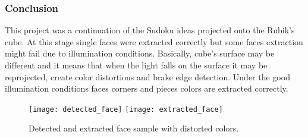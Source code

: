 \documentclass[../../main]{subfiles}
\begin{document}
\subsubsection{Conclusion}

This project was a continuation of the Sudoku ideas projected onto the Rubik's cube. At this stage single faces were extracted correctly but some faces extraction might fail due to illumination conditions. Basically, cube's surface may be different and it means that when the light falls on the surface it may be reprojected, create color distortions and brake edge detection. Under the good illumination conditions faces corners and pieces colors are extracted correctly. 

\begin{figure} [ht]
    \begin{center}
        \texttt{[image: detected\_face]}
        \texttt{[image: extracted\_face]}
        \caption{Detected and extracted face sample with distorted colors.}
        \label{fig:rubiks_cube_face_detected}
    \end{center}
\end{figure}
\end{document}
